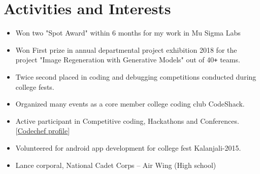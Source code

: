 \documentclass[10pt]{article}
\begin{document}
\section*{Activities and Interests}
\begin{itemize}
 \itemsep0em
 \item Won two "Spot Award" within 6 months for my work in Mu Sigma Labs
 \item 
 Won First prize in annual departmental project exhibition 2018 for the project "Image Regeneration with Generative Models" out of 40\texttt{+} teams.
 \item 
 Twice second placed in coding and debugging competitions conducted during college fests.
 \item
 Organized many events as a core member college coding club CodeShack.
 \item
 Active participant in Competitive coding, Hackathons and Conferences. \hfill\textcolor{grey_darker}{[\underline{\href{https://www.codechef.com/users/raghavadhanya}{Codechef profile}}]}
 \item
 Volunteered for android app development for college fest Kalanjali-2015.
 \item
 Lance corporal, National Cadet Corps – Air Wing (High school)

\end{itemize}
\end{document}
